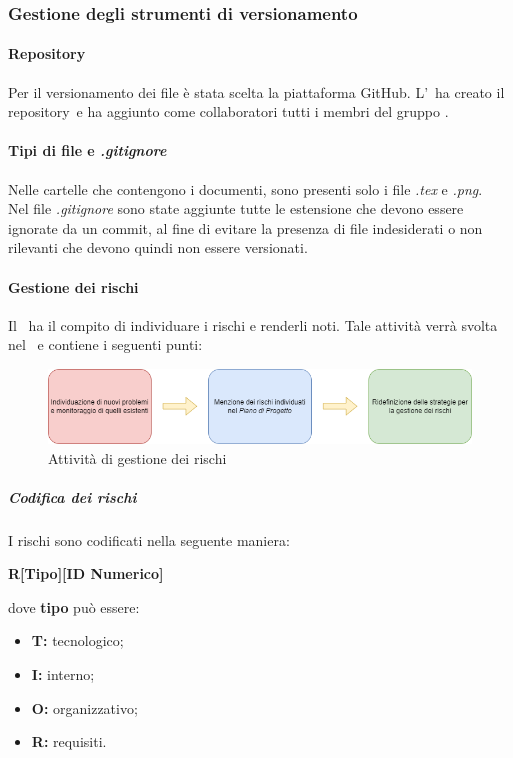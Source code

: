     \subsubsection{Gestione degli strumenti di versionamento}
      \paragraph{Repository\glo}
        Per il versionamento dei file è stata scelta la piattaforma GitHub\glo. L'\roleAdministratorLow\ ha creato il repository\glo\ e ha aggiunto 
        come collaboratori tutti i membri del gruppo \groupName.

      \paragraph{Tipi di file e \textit{.gitignore}}
        Nelle cartelle che contengono i documenti, sono presenti solo i file \textit{.tex} e \textit{.png}.\\
        Nel file \textit{.gitignore} sono state aggiunte tutte le estensione che devono essere ignorate da un commit, al fine di evitare la presenza di file indesiderati 
        o non rilevanti che devono quindi non essere versionati.
    \paragraph {Gestione dei rischi}
      Il \roleProjectManagerLow\ ha il compito di individuare i rischi e renderli noti. Tale attività verrà svolta nel \docNamePdPLow\ e contiene i seguenti punti:
      \begin{figure}[htbp]
        \centering 
         \includegraphics[scale =0.7]{../template/images/NdP/GestioneRischi.png}
         \caption{Attività di gestione dei rischi}
      \end {figure}
      
      \subparagraph {Codifica dei rischi}
     I rischi sono codificati nella seguente maniera: \\
     \begin{center}
      \textbf{\Large{R[Tipo][ID Numerico]}}
    \end{center}
    dove \textbf{tipo} può essere:
    \begin{itemize}
      \item \textbf{T:} tecnologico;
      \item \textbf{I:} interno;
      \item \textbf{O:} organizzativo;
      \item \textbf{R:} requisiti.
    \end{itemize}
    


